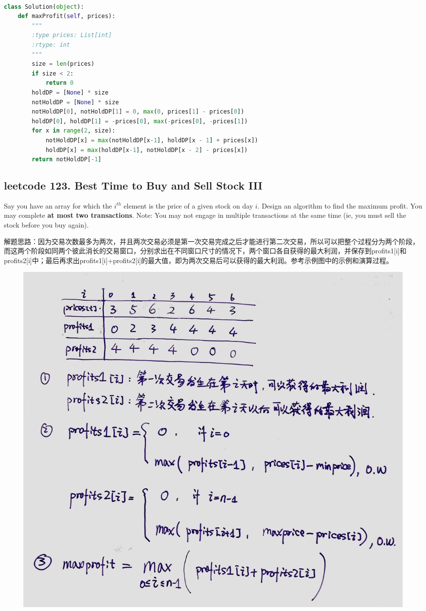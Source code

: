 \documentclass[a4paper,10pt]{article}
\begin{document}
\begin{lstlisting}[language=Python, caption=Problem309. Best Time to Buy and Sell Stock with Cooldown]

class Solution(object):
    def maxProfit(self, prices):
        """
        :type prices: List[int]
        :rtype: int
        """
        size = len(prices)
        if size < 2:
            return 0
        holdDP = [None] * size
        notHoldDP = [None] * size
        notHoldDP[0], notHoldDP[1] = 0, max(0, prices[1] - prices[0])
        holdDP[0], holdDP[1] = -prices[0], max(-prices[0], -prices[1])
        for x in range(2, size):
            notHoldDP[x] = max(notHoldDP[x-1], holdDP[x - 1] + prices[x])
            holdDP[x] = max(holdDP[x-1], notHoldDP[x - 2] - prices[x])
        return notHoldDP[-1]
\end{lstlisting}


\subsection{leetcode 123. Best Time to Buy and Sell Stock III}
Say you have an array for which the $i^{th}$ element is the price of a given stock on day $i$. Design an algorithm to find the maximum profit. You may complete \textbf{at most two transactions}. Note: You may not engage in multiple transactions at the same time (ie, you must sell the stock before you buy again). \\

\begin{CJK*}{UTF8}{gbsn}
\noindent 解题思路：因为交易次数最多为两次，并且两次交易必须是第一次交易完成之后才能进行第二次交易，所以可以把整个过程分为两个阶段，而这两个阶段如同两个彼此消长的交易窗口，分别求出在不同窗口尺寸的情况下，两个窗口各自获得的最大利润，并保存到profits1[i]和profits2[i]中；最后再求出profits1[i]+profits2[i]的最大值，即为两次交易后可以获得的最大利润。参考示例图中的示例和演算过程。
\end{CJK*}

\begin{figure}[h]
\includegraphics[width=\textwidth]{leetcode123.jpg}
\centering\\
\end{figure}
\end{document}
